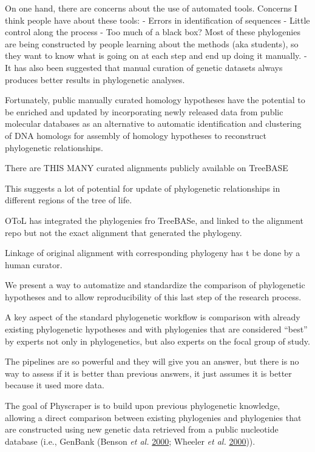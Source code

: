 \documentclass[]{article}
\begin{document}
On one hand, there are concerns about the use of automated tools.
Concerns I think people have about these tools:
- Errors in identification of sequences
- Little control along the process
- Too much of a black box? Most of these phylogenies are being constructed by people learning about the methods (aka students), so they want to know what is going on at each step and end up doing it manually.
-
It has also been suggested that manual curation of genetic datasets always produces better results in phylogenetic analyses.

Fortunately, public manually curated homology hypotheses have the potential to be enriched and updated by incorporating newly released data from public molecular databases as an alternative to automatic identification and clustering of DNA homologs for assembly of homology hypotheses to reconstruct phylogenetic relationships.

There are THIS MANY curated alignments publicly available on TreeBASE

This suggests a lot of potential for update of phylogenetic relationships in different regions of the tree of life.

OToL has integrated the phylogenies fro TreeBASe, and linked to the alignment repo but not the exact alignment that generated the phylogeny.

Linkage of original alignment with corresponding phylogeny has t be done by a human curator.

We present a way to automatize and standardize the comparison of phylogenetic hypotheses and to allow reproducibility of this last step of the research process.

A key aspect of the standard phylogenetic workflow is comparison with already existing
phylogenetic hypotheses and with phylogenies that are considered ``best'' by experts
not only in phylogenetics, but also experts on the focal group of study.

The pipelines are so powerful and they will give you an answer, but there
is no way to assess if it is better than previous answers, it just assumes it is
better because it used more data.

The goal of Physcraper is to build upon previous phylogenetic knowledge,
allowing a direct comparison between existing phylogenies and phylogenies that are constructed
using new genetic data retrieved from a public nucleotide database (i.e., GenBank (Benson \emph{et al.} \protect\hyperlink{ref-benson2000genbank}{2000}; Wheeler \emph{et al.} \protect\hyperlink{ref-wheeler2000database}{2000})).
\end{document}
